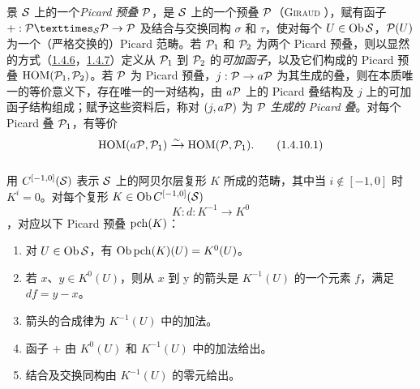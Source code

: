 \subsubsection{} 景 ${\mathcal S}$ 上的一个\pageoriginale\emph{Picard 预叠} ${\mathcal P}$，是 ${\mathcal S}$ 上的一个预叠 ${\mathcal P}$（\textsc{Giraud} \cite{sga4.exp.XVIII.bib.1}），赋有函子 $+:\fprod{\Pp}{\Pp}{\Ss}\rightarrow \Pp$ 及结合与交换同构 $\sigma$ 和 $\tau$，使对每个 $U\in \operatorname{Ob} {\mathcal S}$，${\mathcal P}(U)$ 为一个（严格交换的）Picard 范畴。若 ${\mathcal P}_{1}$ 和 ${\mathcal P}_{2}$ 为两个 Picard 预叠，则以显然的方式（\cf \hyperref[XVIII.subsubsec1.4.6]{1.4.6}，\hyperref[XVIII.subsubsec1.4.7]{1.4.7}）定义从 ${\mathcal P}_{1}$ 到 ${\mathcal P}_{2}$ 的\emph{可加函子}，以及它们构成的 Picard 预叠 $\operatorname{HOM}({\mathcal P}_{1}, {\mathcal P}_{2})$。若 ${\mathcal P}$ 为 Picard 预叠，$j:{\mathcal P}\rightarrow
a{\mathcal P}$ 为其生成的叠，则在本质唯一的等价意义下，存在唯一的一对结构，由 $a{\mathcal P}$ 上的 Picard 叠结构及 $j$ 上的可加函子结构组成；赋予这些资料后，称对 $(j,a{\mathcal P})$ 为 ${\mathcal P}$ \emph{生成的 Picard 叠}。对每个 Picard 叠 ${\mathcal P}_{1}$，有等价 \begin{equation*}
\operatorname{HOM}(a{\mathcal P},{\mathcal P}_{1})\xrightarrow{\sim} \operatorname{HOM}({\mathcal P},{\mathcal P}_{1}){}.\tag{1.4.10.1}
\end{equation*}

\subsubsection{} 用 $C^{[-1,0]}({\mathcal S})$ 表示 ${\mathcal S}$ 上的阿贝尔层复形 $K$ 所成的范畴，其中当 $i\not\in [-1,0]$ 时 $K^{i}=0$。对每个复形 $K\in \operatorname{Ob} C^{[-1,0]}({\mathcal S})$ $$
K:d:K^{-1}\longrightarrow K^{0}
$$，对应以下 Picard 预叠 $\operatorname{pch}(K)$：

\begin{enumerate} \renewcommand{\theenumi}{\Roman{enumi}} \renewcommand{\labelenumi}{(\theenumi)} \item 对 $U\in \operatorname{Ob} {\mathcal S}$，有 $\operatorname{Ob} \operatorname{pch}(K)(U)=K^{0}(U)$。

\item 若 $x$、$y\in K^{0}(U)$，则从 $x$ 到 y 的箭头是 $K^{-1}(U)$ 的一个元素 $f$，满足 $df=y-x$。

\item 箭头的合成律为 $K^{-1}(U)$ 中的加法。

\item 函子 $+$ 由 $K^{0}(U)$ 和 $K^{-1}(U)$ 中的加法给出。

\item 结合及交换同构由 $K^{-1}(U)$ 的零元给出。 \end{enumerate}

